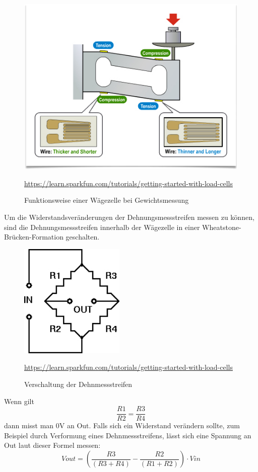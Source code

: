\begin{figure}[ht]
    \center
    \includegraphics[width=15cm]{Bilder/waegezelle-funktionsweise.png}\\
    \caption{Funktionsweise einer Wägezelle bei Gewichtsmessung }
    \begin{flushleft} \quelle\url{https://learn.sparkfun.com/tutorials/getting-started-with-load-cells} \end{flushleft}
\end{figure}
Um die Widerstandsveränderungen der Dehnungsmessstreifen messen zu können, sind die Dehnungsmessstreifen innerhalb der Wägezelle in einer Wheatstone-Brücken-Formation geschalten.

\newpage

\begin{figure}[ht]
    \center
    \includegraphics[width=5cm]{Bilder/waegezelle-verschaltung.jpg}\\
    \caption{Verschaltung der Dehnmessstreifen}
    \begin{flushleft} \quelle\url{https://learn.sparkfun.com/tutorials/getting-started-with-load-cells} \end{flushleft}
\end{figure}
Wenn gilt \[\frac{R1}{R2}=\frac{R3}{R4}\]dann misst man 0V an Out. Falls sich ein Widerstand verändern sollte, zum Beispiel durch Verformung eines Dehnmessstreifens, lässt sich eine Spannung an Out laut dieser Formel messen: \\
\[Vout=(\frac{R3}{(R3+R4)}-\frac{R2}{(R1+R2)}) \cdot Vin\]

